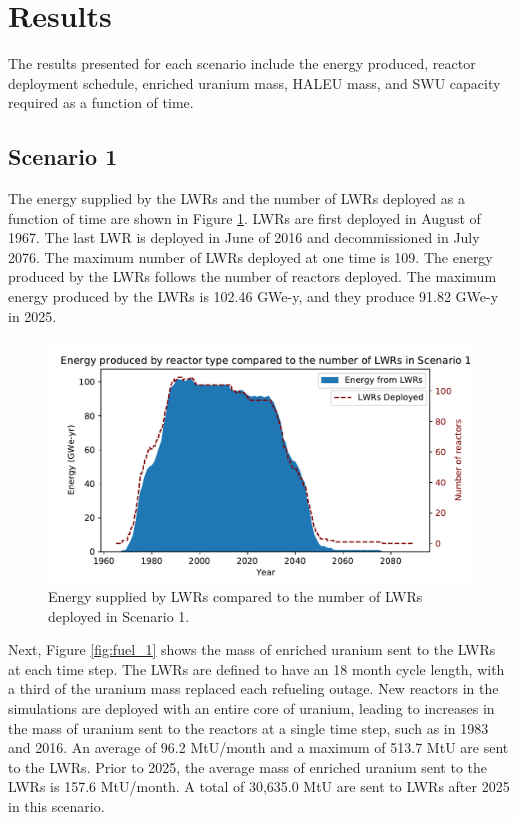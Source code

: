 \section{Results}
The results presented for each scenario include the energy produced, reactor 
deployment schedule, enriched
uranium mass, \gls{HALEU} mass, and \gls{SWU} capacity required as a function 
of time. 

\subsection{Scenario 1}
The energy supplied by the \glspl{LWR} and the number of \glspl{LWR}
deployed as a function of time are shown in Figure \ref{fig:energy_rx_1}. 
\glspl{LWR} are first deployed in August of 1967. The last 
\gls{LWR} is deployed in June of 2016 and decommissioned in July 2076. The 
maximum number of 
\glspl{LWR} deployed at one time is 109. The energy produced by the 
\glspl{LWR} follows the number of reactors deployed. The maximum energy 
produced by the \glspl{LWR} is 102.46 GWe-y, and they produce 91.82 GWe-y 
in 2025.

\begin{figure}
    \centering 
    \includegraphics[width=\textwidth]{../figures/energy_scenario1.pdf}
    \caption{Energy supplied by \glspl{LWR} compared to the number of 
    \glspl{LWR} deployed in Scenario 1.}
    \label{fig:energy_rx_1}
\end{figure}

Next, Figure \ref{fig:fuel_1} shows the mass of enriched uranium sent to 
the \glspl{LWR} at each time step. The \glspl{LWR} are 
defined to have an 18 month cycle length, with a third of the uranium 
mass replaced each refueling outage. New reactors in the simulations 
are deployed with an entire core of uranium, leading 
to increases in the mass of uranium sent to the reactors at a single time 
step, such 
as in 1983 and 2016. An average of 96.2 MtU/month and a maximum of 513.7 MtU 
are sent to the \glspl{LWR}. Prior to 2025, the average mass
of enriched uranium sent to the \glspl{LWR} is 157.6 MtU/month. A total 
of 30,635.0 MtU are sent to \glspl{LWR} after 2025 in this scenario. 


